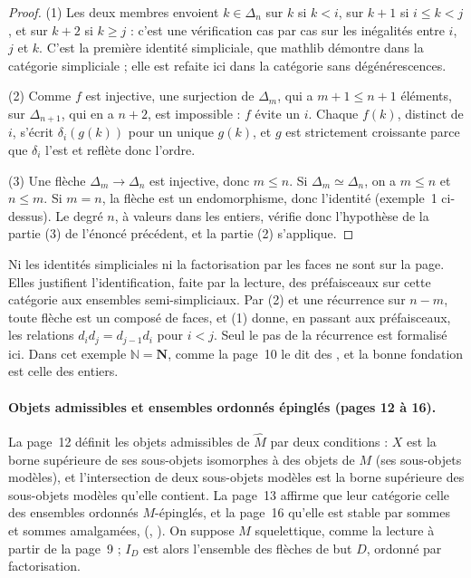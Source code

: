 \begin{proof}
(1) Les deux membres envoient $k \in \Delta_n$ sur $k$ si $k < i$, sur $k + 1$ si $i \leq k < j$, et sur $k + 2$ si $k \geq j$ : c'est une vérification cas par cas sur les inégalités entre $i$, $j$ et $k$. C'est la première identité simpliciale, que mathlib démontre dans la catégorie simpliciale ; elle est refaite ici dans la catégorie sans dégénérescences.

(2) Comme $f$ est injective, une surjection de $\Delta_m$, qui a $m + 1 \leq n + 1$ éléments, sur $\Delta_{n+1}$, qui en a $n + 2$, est impossible : $f$ évite un $i$. Chaque $f(k)$, distinct de $i$, s'écrit $\delta_i(g(k))$ pour un unique $g(k)$, et $g$ est strictement croissante parce que $\delta_i$ l'est et reflète donc l'ordre.

(3) Une flèche $\Delta_m \to \Delta_n$ est injective, donc $m \leq n$. Si $\Delta_m \simeq \Delta_n$, on a $m \leq n$ et $n \leq m$. Si $m = n$, la flèche est un endomorphisme, donc l'identité (exemple~1 ci-dessus). Le degré $n$, à valeurs dans les entiers, vérifie donc l'hypothèse de la partie (3) de l'énoncé précédent, et la partie (2) s'applique.
\end{proof}

\begin{remarque}
Ni les identités simpliciales ni la factorisation par les faces ne sont sur la page. Elles justifient l'identification, faite par la lecture, des préfaisceaux sur cette catégorie aux ensembles semi-simpliciaux. Par (2) et une récurrence sur $n - m$, toute flèche est un composé de faces, et (1) donne, en passant aux préfaisceaux, les relations $d_i d_j = d_{j-1} d_i$ pour $i < j$. Seul le pas de la récurrence est formalisé ici. Dans cet exemple $\mathbb N = \mathbf N$, comme la page~10 le dit des , et la bonne fondation est celle des entiers.
\end{remarque}

\paragraph{Objets admissibles et ensembles ordonnés épinglés (pages 12 à 16).} La page~12 définit les objets admissibles de $\widehat M$ par deux conditions : $X$ est la borne supérieure de ses sous-objets isomorphes à des objets de $M$ (ses sous-objets modèles), et l'intersection de deux sous-objets modèles est la borne supérieure des sous-objets modèles qu'elle contient. La page~13 affirme que leur catégorie  celle des ensembles ordonnés $M$-épinglés, et la page~16 qu'elle est stable par sommes et sommes amalgamées,  (, ). On suppose $M$ squelettique, comme la lecture à partir de la page~9 ; $I_D$ est alors l'ensemble des flèches de but $D$, ordonné par factorisation.

